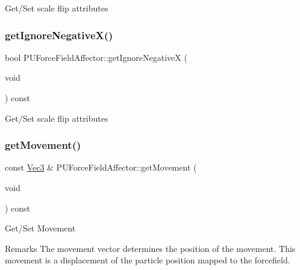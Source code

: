 Get/\+Set scale flip attributes \mbox{\label{classPUForceFieldAffector_a8ea01b32511213bfff8496bf05369dde}} 
\subsubsection{\texorpdfstring{get\+Ignore\+Negative\+X()}{getIgnoreNegativeX()}\hspace{0.1cm}{\footnotesize\ttfamily [2/2]}}
{\footnotesize\ttfamily bool P\+U\+Force\+Field\+Affector\+::get\+Ignore\+NegativeX (\begin{DoxyParamCaption}\item[{void}]{ }\end{DoxyParamCaption}) const}

Get/\+Set scale flip attributes \mbox{\label{classPUForceFieldAffector_afa86a49b2ae5aa552c41eea894a71b9a}} 
\subsubsection{\texorpdfstring{get\+Movement()}{getMovement()}\hspace{0.1cm}{\footnotesize\ttfamily [1/2]}}
{\footnotesize\ttfamily const \hyperlink{classVec3}{Vec3} \& P\+U\+Force\+Field\+Affector\+::get\+Movement (\begin{DoxyParamCaption}\item[{void}]{ }\end{DoxyParamCaption}) const}

Get/\+Set Movement \begin{DoxyRemark}{Remarks}
The movement vector determines the position of the movement. This movement is a displacement of the particle position mapped to the forcefield. 
\end{DoxyRemark}
\mbox{\label{classPUForceFieldAffector_a51dc2e241f92d6cb5ac3f259432afef7}} 
